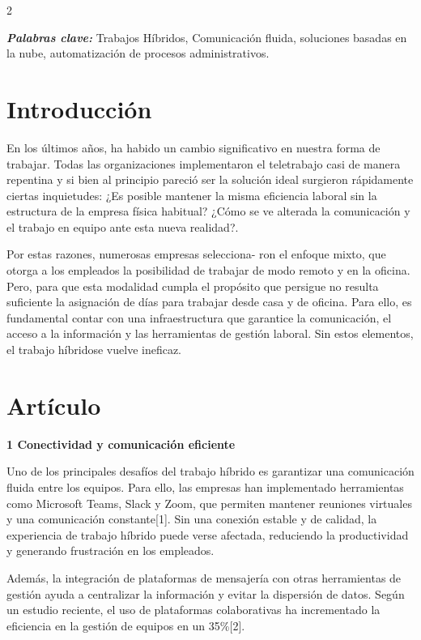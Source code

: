 \documentclass[12pt,spanish,Letterpaper,openany]{book}
\begin{document}
\begin {multicols}{2}

\textbf{\emph{Palabras clave:}} Trabajos Híbridos, Comunicación fluida, soluciones basadas en la nube, automatización de procesos administrativos.

\hypertarget{introducciuxf3n-16}{%
\section{Introducción}\label{introducciuxf3n-16}}

En los últimos años, ha habido un cambio significativo en nuestra forma de trabajar. Todas
las organizaciones implementaron el teletrabajo casi de manera repentina y si bien al
principio pareció ser la solución ideal surgieron rápidamente ciertas inquietudes: ¿Es posible
mantener la misma eficiencia laboral sin la estructura de la empresa física habitual? ¿Cómo
se ve alterada la comunicación y el trabajo en equipo ante esta nueva realidad?.

Por estas razones, numerosas empresas selecciona-
ron el enfoque mixto, que otorga a los
empleados la posibilidad de trabajar de modo remoto y en la oficina. Pero, para que esta
modalidad cumpla el propósito que persigue no resulta suficiente la asignación de días para
trabajar desde casa y de oficina. Para ello, es fundamental contar con una infraestructura que
garantice la comunicación, el acceso a la información y las herramientas de gestión laboral.
Sin estos elementos, el trabajo híbridose vuelve ineficaz.

\hypertarget{artuxedculo-16}{%
\section{Artículo}\label{artuxedculo-16}}

\textbf{1 Conectividad y comunicación eficiente}

Uno de los principales desafíos del trabajo híbrido es garantizar una comunicación fluida
entre los equipos. Para ello, las empresas han implementado herramientas como Microsoft
Teams, Slack y Zoom, que permiten mantener reuniones virtuales y una comunicación
constante{[}1{]}. Sin una conexión estable y de calidad, la experiencia de trabajo híbrido puede
verse afectada, reduciendo la productividad y generando frustración en los empleados.

Además, la integración de plataformas de mensajería con otras herramientas de gestión
ayuda a centralizar la información y evitar la dispersión de datos. Según un estudio reciente,
el uso de plataformas colaborativas ha incrementado la eficiencia en la gestión de equipos en
un 35\%{[}2{]}.


\end{multicols}
\end{document}
